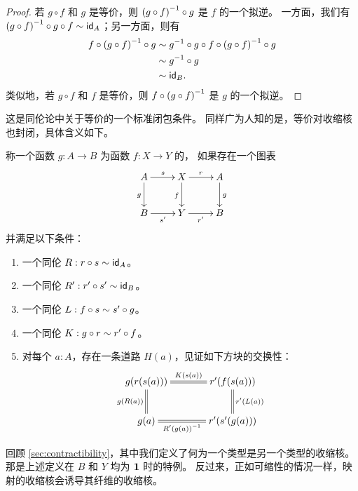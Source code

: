 \begin{proof}
  若 $g\circ f$ 和 $g$ 是等价，则 $\opp{(g\circ f)} \circ g$ 是 $f$ 的一个拟逆。
  一方面，我们有 $\opp{(g\circ f)} \circ g \circ f \htpy \idfunc[A]$；另一方面，则有
  \begin{align*}
    f \circ \opp{(g\circ f)} \circ g
    &\htpy \opp g \circ g \circ f \circ \opp{(g\circ f)} \circ g\\
    &\htpy \opp g \circ g\\
    &\htpy \idfunc[B].
  \end{align*}
  类似地，若 $g\circ f$ 和 $f$ 是等价，则 $f\circ \opp{(g\circ f)}$ 是 $g$ 的一个拟逆。
\end{proof}

这是同伦论中关于等价的一个标准闭包条件。
同样广为人知的是，等价对收缩核也封闭，具体含义如下。

%

\begin{defn}\label{defn:retract}
  称一个函数 $g:A\to B$ 为函数 $f:X\to Y$ 的，
  如果存在一个图表
  \begin{equation*}
  \xymatrix{
    {A} \ar[r]^{s} \ar[d]_{g}
    &
    {X} \ar[r]^{r} \ar[d]_{f}
    &
    {A} \ar[d]^{g}
    \\
    {B} \ar[r]_{s'}
    &
    {Y} \ar[r]_{r'}
    &
    {B}
  }
\end{equation*}
  并满足以下条件：
  \begin{enumerate}
    \item 一个同伦 $R:r\circ s \htpy \idfunc[A]$。
    \item 一个同伦 $R':r'\circ s' \htpy\idfunc[B]$。
    \item 一个同伦 $L:f\circ s\htpy s'\circ g$。
    \item 一个同伦 $K:g\circ r\htpy r'\circ f$。
    \item 对每个 $a:A$，存在一条道路 $H(a)$，见证如下方块的交换性：
      \begin{equation*}
  \xymatrix@C=3pc{
    {g(r(s(a)))} \ar@{=}[r]^-{K(s(a))} \ar@{=}[d]_{\ap g{R(a)}}
    &
    {r'(f(s(a)))} \ar@{=}[d]^{\ap{r'}{L(a)}}
    \\
    {g(a)} \ar@{=}[r]_-{\opp{R'(g(a))}}
    &
    {r'(s'(g(a)))}
  }
\end{equation*}
  \end{enumerate}
\end{defn}

回顾 \cref{sec:contractibility}，其中我们定义了何为一个类型是另一个类型的收缩核。
那是上述定义在 $B$ 和 $Y$ 均为 $\unit$ 时的特例。
反过来，正如可缩性的情况一样，映射的收缩核会诱导其纤维的收缩核。

